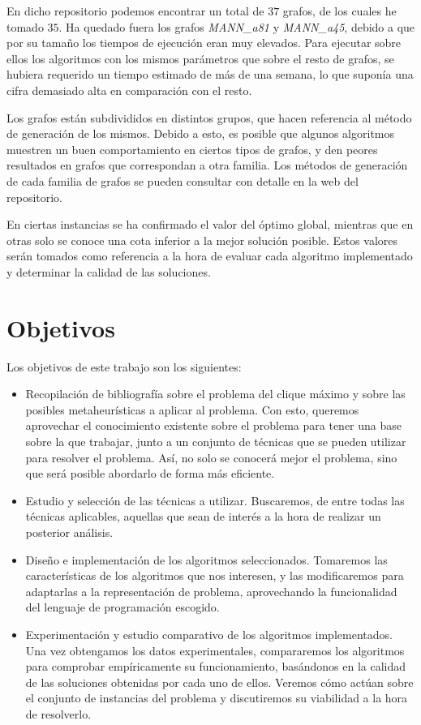 En dicho repositorio podemos encontrar un total de $37$ grafos, de los cuales he tomado $35$.
Ha quedado fuera los grafos \textit{MANN\_a81} y \textit{MANN\_a45}, debido a que por su tamaño
los tiempos de ejecución eran muy elevados. Para ejecutar sobre ellos los algoritmos con los
mismos parámetros que sobre el resto de grafos, se hubiera requerido un tiempo estimado de más
de una semana, lo que suponía una cifra demasiado alta en comparación con el resto.

Los grafos están subdivididos en distintos grupos, que hacen referencia al método de
generación de los mismos. Debido a esto, es posible que algunos algoritmos muestren
un buen comportamiento en ciertos tipos de grafos, y den peores resultados en grafos
que correspondan a otra familia. Los métodos de generación de cada familia de grafos
se pueden consultar con detalle en la web del repositorio.

En ciertas instancias se ha confirmado el valor del óptimo global, mientras que en
otras solo se conoce una cota inferior a la mejor solución posible. Estos valores
serán tomados como referencia a la hora de evaluar cada algoritmo implementado y
determinar la calidad de las soluciones.

\section{Objetivos}
Los objetivos de este trabajo son los siguientes:

\begin{itemize}
  \item Recopilación de bibliografía sobre el problema del clique máximo y sobre
        las posibles metaheurísticas a aplicar al problema. Con esto, queremos
        aprovechar el conocimiento existente sobre el problema para tener una
        base sobre la que trabajar, junto a un conjunto de técnicas que se pueden
        utilizar para resolver el problema. Así, no solo se conocerá mejor el problema,
        sino que será posible abordarlo de forma más eficiente.

  \item Estudio y selección de las técnicas a utilizar. Buscaremos, de entre todas
        las técnicas aplicables, aquellas que sean de interés a la hora de realizar
        un posterior análisis.

  \item Diseño e implementación de los algoritmos seleccionados. Tomaremos las
        características de los algoritmos que nos interesen, y las modificaremos
        para adaptarlas a la representación de problema, aprovechando la funcionalidad
        del lenguaje de programación escogido.

  \item Experimentación y estudio comparativo de los algoritmos implementados.
        Una vez obtengamos los datos experimentales, compararemos los algoritmos
        para comprobar empíricamente su funcionamiento, basándonos en la calidad
        de las soluciones obtenidas por cada uno de ellos. Veremos cómo actúan
        sobre el conjunto de instancias del problema y discutiremos su viabilidad
        a la hora de resolverlo.
\end{itemize}

